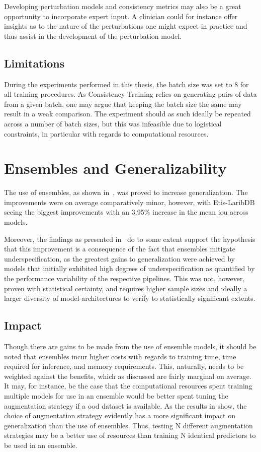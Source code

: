     Developing perturbation models and consistency metrics may also be a great opportunity to incorporate expert input. A clinician could for instance offer insights as to the nature of the perturbations one might expect in practice and thus assist in the development of the perturbation model.
    
\subsection{Limitations}
    During the experiments performed in this thesis, the batch size was set to 8 for all training procedures. As Consistency Training relies on generating pairs of data from a given batch, one may argue that keeping the batch size the same may result in a weak comparison. The experiment should as such ideally be repeated across a number of batch sizes, but this was infeasible due to logistical constraints, in particular with regards to computational resources. 


\section{Ensembles and Generalizability}
    The use of ensembles, as shown in~, was proved to increase generalization. The improvements were on average comparatively minor, however, with Etis-LaribDB seeing the biggest improvements with an 3.95\% increase in the mean \gls{iou} across models. 
    
    Moreover, the findings as presented in~ do to some extent support the hypothesis that this improvement is a consequence of the fact that ensembles mitigate underspecification, as the greatest gains to generalization were achieved by models that initially exhibited high degrees of underspecification as quantified by the performance variability of the respective pipelines. This was not, however, proven with statistical certainty, and requires higher sample sizes and ideally a larger diversity of model-architectures to verify to statistically significant extents.  

    
    \subsection{Impact}
    Though there are gains to be made from the use of ensemble models, it should be noted that ensembles incur higher costs with regards to training time, time required for inference, and memory requirements. This, naturally, needs to be weighted against the benefits, which as discussed are fairly marginal on average. It may, for instance, be the case that the computational resources spent training multiple models for use in an ensemble would be better spent tuning the augmentation strategy if a \gls{ood} dataset is available. As the results in  show, the choice of augmentation strategy evidently has a more significant impact on generalization than the use of ensembles. Thus, testing N different augmentation strategies may be a better use of resources than training N identical predictors to be used in an ensemble.  
 

